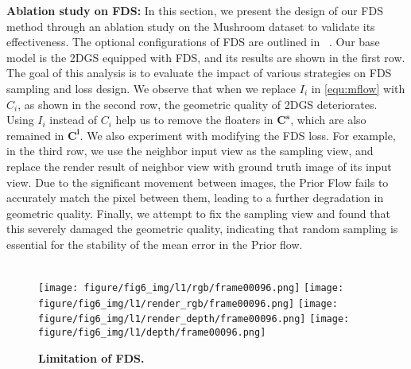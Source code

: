 \textbf{Ablation study on FDS: }
In this section, we present the design of our FDS 
method through an ablation study on the 
Mushroom dataset to validate its effectiveness.
%
The optional configurations of FDS are outlined in ~.
Our base model is the 2DGS equipped with FDS,
and its results are shown 
in the first row. The goal of this analysis 
is to evaluate the impact 
of various strategies on FDS sampling and loss design.
%
We observe that when we 
replace $I_i$ in \eqref{equ:mflow} with $C_i$, 
as shown in the second row, the geometric quality 
of 2DGS deteriorates. Using $I_i$ instead of $C_i$ 
help us to remove the floaters in $\bm{C^s}$, which are also 
remained in $\bm{C^i}$.
We also experiment with modifying the FDS loss. For example, 
in the third row, we use the neighbor 
input view as the sampling view, and replace the 
render result of neighbor view with ground truth image of its input view.
%
Due to the significant movement between images, the Prior Flow fails to accurately 
match the pixel between them, leading to a further degradation in geometric quality.
%
Finally, we attempt to fix the sampling view 
and found that this severely damaged the geometric quality, 
indicating that random sampling is essential for the stability 
of the mean error in the Prior flow.



\begin{table}[t] \centering

\begin{minipage}[t]{1.0\linewidth}
        \label{tab:ablation_fds}
        
\end{minipage}
\end{table}




\begin{figure}[htbp] \centering
    \makebox[0.22\textwidth]{}
    \makebox[0.22\textwidth]{}
    \makebox[0.22\textwidth]{}
    \makebox[0.22\textwidth]{}
    \\

    \texttt{[image: figure/fig6\_img/l1/rgb/frame00096.png]}
    \texttt{[image: figure/fig6\_img/l1/render\_rgb/frame00096.png]}
    \texttt{[image: figure/fig6\_img/l1/render\_depth/frame00096.png]}
    \texttt{[image: figure/fig6\_img/l1/depth/frame00096.png]}


    \caption{\textbf{Limitation of FDS.} }
    \label{fig:limitation}
\end{figure}


